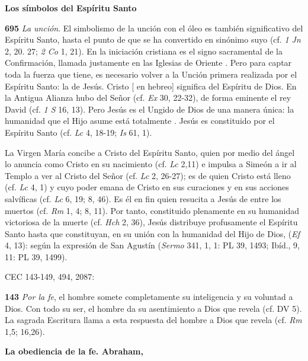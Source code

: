 \begin{body}
\begin{body}
\textbf{Los símbolos del Espíritu Santo}

\textbf{695} \emph{La unción}. El simbolismo de la unción con el óleo es también significativo del Espíritu Santo, hasta el punto de que se ha convertido en sinónimo suyo (cf. \emph{1 Jn} 2, 20. 27; \emph{2 Co} 1, 21). En la iniciación cristiana es el signo sacramental de la Confirmación, llamada justamente en las Iglesias de Oriente . Pero para captar toda la fuerza que tiene, es necesario volver a la Unción primera realizada por el Espíritu Santo: la de Jesús. Cristo {[} en hebreo{]} significa  del Espíritu de Dios. En la Antigua Alianza hubo  del Señor (cf. \emph{Ex} 30, 22-32), de forma eminente el rey David (cf. \emph{1 S} 16, 13). Pero Jesús es el Ungido de Dios de una manera única: la humanidad que el Hijo asume está totalmente . Jesús es constituido  por el Espíritu Santo (cf. \emph{Lc} 4, 18-19; \emph{Is} 61, 1).

La Virgen María concibe a Cristo del Espíritu Santo, quien por medio del ángel lo anuncia como Cristo en su nacimiento (cf. \emph{Lc} 2,11) e impulsa a Simeón a ir al Templo a ver al Cristo del Señor (cf. \emph{Lc} 2, 26-27); es de quien Cristo está lleno (cf. \emph{Lc} 4, 1) y cuyo poder emana de Cristo en sus curaciones y en sus acciones salvíficas (cf. \emph{Lc} 6, 19; 8, 46). Es él en fin quien resucita a Jesús de entre los muertos (cf. \emph{Rm} 1, 4; 8, 11). Por tanto, constituido plenamente  en su humanidad victoriosa de la muerte (cf. \emph{Hch} 2, 36), Jesús distribuye profusamente el Espíritu Santo hasta que  constituyan, en su unión con la humanidad del Hijo de Dios,  (\emph{Ef} 4, 13):  según la expresión de San Agustín (\emph{Sermo} 341, 1, 1: PL 39, 1493; Ibíd., 9, 11: PL 39, 1499).


CEC 143-149, 494, 2087:

\textbf{143} \emph{Por la fe}, el hombre somete completamente su inteligencia y su voluntad a Dios. Con todo su ser, el hombre da su asentimiento a Dios que revela (cf. DV 5). La sagrada Escritura llama  a esta respuesta del hombre a Dios que revela (cf. \emph{Rm} 1,5; 16,26).

\textbf{La obediencia de la fe. Abraham, }


\end{body}
\end{body}
